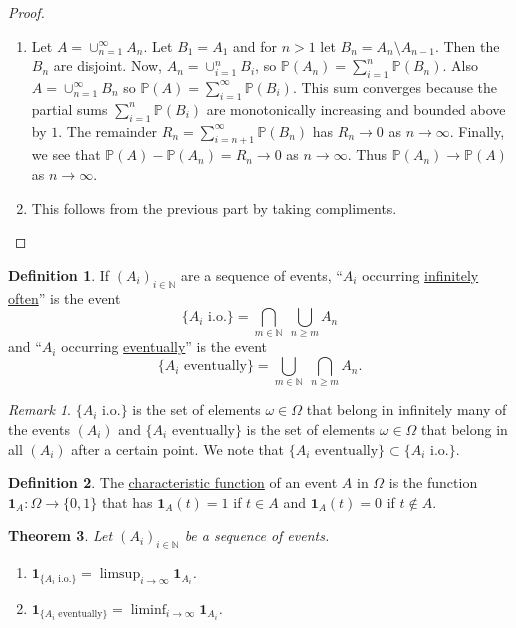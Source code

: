 \documentclass[11pt]{article}
\newcommand{\p}{\mathbb{P}}
\newcommand{\ind}[1]{\mathbf{1}_{#1}}
\newcommand{\defname}[1]{\underline{#1}}
\newcommand{\NN}{\mathbb{N}}
\theoremstyle{theorem}
\newtheorem{theorem}{Theorem}[section]
\theoremstyle{definition}
\newtheorem{definition}[theorem]{Definition}
\theoremstyle{remark}
\newtheorem*{remark}{Remark}
\theoremstyle{step}
\theoremstyle{gap}
\begin{document}
\begin{proof}\ 
\begin{enumerate}
\item
Let \(A = \cup_{n=1}^\infty A_n\). Let \(B_1 = A_1\) and for \(n > 1\) let \(B_n = A_n \setminus A_{n-1}\). Then the \(B_n\) are disjoint.
Now, \(A_n = \cup_{i=1}^n B_i\), so \(\p(A_n) = \sum_{i=1}^n \p(B_n)\). Also \(A = \cup_{n=1}^\infty B_n\) so \(\p(A) = \sum_{i=1}^\infty \p(B_i)\). This sum converges because the partial sums \(\sum_{i=1}^n \p(B_i)\) are monotonically increasing and bounded above by \(1\). The remainder \(R_n = \sum_{i = n+1}^\infty \p(B_n)\) has \(R_n \to 0\) as \(n \to \infty\).
Finally, we see that \(\p(A) - \p(A_n) = R_n \to 0\) as \(n \to \infty\). Thus \(\p(A_n) \to \p(A)\) as \(n \to \infty\).

\item
This follows from the previous part by taking compliments.
\end{enumerate}
\end{proof}

\begin{definition}
If \((A_i)_{i \in \NN}\) are a sequence of events, ``\(A_i\) occurring \defname{infinitely often}'' is the event
\[\{A_i \text{ i.o.}\} = \bigcap_{m \in \NN} \;\bigcup_{n \geq m} A_n\]
and ``\(A_i\) occurring \defname{eventually}'' is the event
\[\{A_i \text{ eventually}\} = \bigcup_{m \in \NN} \;\bigcap_{n \geq m} A_n.\]
\end{definition}

\begin{remark}
\(\{A_i \text{ i.o.}\}\) is the set of elements \(\omega \in \Omega\) that belong in infinitely many of the events \((A_i)\) and \(\{A_i \text{ eventually}\}\) is the set of elements \(\omega \in \Omega\) that belong in all \((A_i)\) after a certain point. We note that \(\{A_i \text{ eventually}\} \subset \{A_i \text{ i.o.}\}\).
\end{remark}

\begin{definition}
The \defname{characteristic function} of an event \(A\) in \(\Omega\) is the function \(\ind{A}:\Omega \to \{0, 1\}\) that has \(\ind{A}(t) = 1\) if \(t \in A\) and \(\ind{A}(t) = 0\) if \(t \not\in A\).
\end{definition}

\begin{theorem}\label{thm.eventsio.charf}
Let \((A_i)_{i \in \NN}\) be a sequence of events.
\begin{enumerate}
\item
\(\ind{\{A_i \text{ i.o.}\}} = \limsup_{i \to \infty} \ind{A_i}\).
\item
\(\ind{\{A_i \text{ eventually}\}} = \liminf_{i \to \infty} \ind{A_i}\).
\end{enumerate}
\end{theorem}
\end{document}
